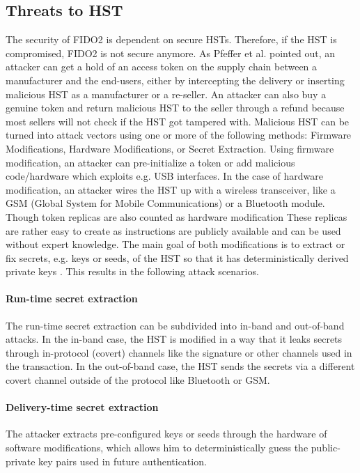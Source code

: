 \documentclass[runningheads]{llncs}
\begin{document}
\subsection{Threats to HST}
The security of FIDO2 is dependent on secure HSTs. Therefore, if the HST is compromised, FIDO2 is not secure anymore. As Pfeffer et al. pointed out, an attacker can get a hold of an access token on the supply chain between a manufacturer and the end-users, either by intercepting the delivery or inserting malicious HST as a manufacturer or a re-seller. An attacker can also buy a genuine token and return malicious HST to the seller through a refund because most sellers will not check if the HST got tampered with. Malicious HST can be turned into attack vectors using one or more of the following methods: Firmware Modifications, Hardware Modifications, or Secret Extraction. Using firmware modification, an attacker can pre-initialize a token or add malicious code/hardware which exploits e.g. USB interfaces. In the case of hardware modification, an attacker wires the HST up with a wireless transceiver, like a GSM (Global System for Mobile Communications) or a Bluetooth module. Though token replicas are also counted as hardware modification These replicas are rather easy to create as instructions are publicly available and can be used without expert knowledge. The main goal of both modifications is to extract or fix secrets, e.g. keys or seeds, of the HST so that it has deterministically derived private keys \cite{272198}. This results in the following attack scenarios.

\paragraph{Run-time secret extraction}
The run-time secret extraction can be subdivided into in-band and out-of-band attacks. In the in-band case, the HST is modified in a way that it leaks secrets through in-protocol (covert) channels like the signature or other channels used in the transaction. In the out-of-band case, the HST sends the secrets via a different covert channel outside of the protocol like Bluetooth or GSM.

\paragraph{Delivery-time secret extraction}
The attacker extracts pre-configured keys or seeds through the hardware of software modifications, which allows him to deterministically guess the public-private key pairs used in future authentication.
\end{document}
